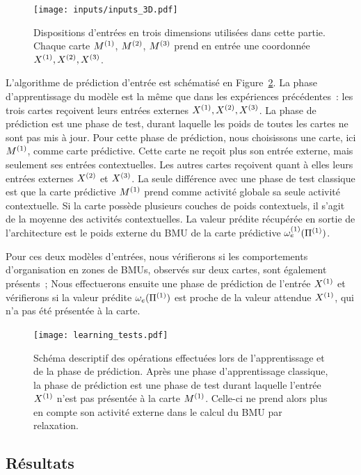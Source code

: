 \documentclass[../main]{subfiles}
\begin{document}
\begin{figure}[h!]
	\texttt{[image: inputs/inputs\_3D.pdf]}
	\caption{Dispositions d'entrées en trois dimensions utilisées dans cette partie. Chaque carte $M^{({1})}$, $M^{({2})}$, $M^{({3})}$ prend en entrée une coordonnée $X^{({1})}, X^{({2})}, X^{({3})}$. \label{fig:inputs_3D}}
\end{figure}

L'algorithme de prédiction d'entrée est schématisé en Figure~\ref{fig:schema_pred}.
La phase d'apprentissage du modèle est la même que dans les expériences précédentes~: les trois cartes reçoivent leurs entrées externes $X^{({1})},X^{({2})}, X^{({3})}$.
La phase de prédiction est une phase de test, durant laquelle les poids de toutes les cartes ne sont pas mis à jour.
Pour cette phase de prédiction, nous choisissons une carte, ici $M^{({1})}$, comme carte prédictive. 
Cette carte ne reçoit plus son entrée externe, mais seulement ses entrées contextuelles. 
Les autres cartes reçoivent quant à elles leurs entrées externes $X^{({2})}$ et $X^{({3})}$.
La seule différence avec une phase de test classique est que la carte prédictive $M^{({1})}$ prend comme activité globale sa seule activité contextuelle. Si la carte possède plusieurs couches de poids contextuels, il s'agit de la moyenne des activités contextuelles.
La valeur prédite récupérée en sortie de l'architecture est le poids externe du BMU de la carte prédictive $\omega_{e}^{({1})}(\Pi^{({1})})$.

Pour ces deux modèles d'entrées, nous vérifierons si les comportements d'organisation en zones de BMUs, observés sur deux cartes, sont également présents~; 
Nous effectuerons ensuite une phase de prédiction de l'entrée $X^{({1})}$ et vérifierons si la valeur prédite $\omega_{e}(\Pi^{({1})})$ est proche de la valeur attendue $X^{({1})}$, qui n'a pas été présentée à la carte.

\begin{figure}
	\texttt{[image: learning\_tests.pdf]}
	\caption{Schéma descriptif des opérations effectuées lors de l'apprentissage et de la phase de prédiction. Après une phase d'apprentissage classique, la phase de prédiction est une phase de test durant laquelle l'entrée $X^{({1})}$ n'est pas présentée à la carte $M^{({1})}$. Celle-ci ne prend alors plus en compte son activité externe dans le calcul du BMU par relaxation. \label{fig:schema_pred}}
\end{figure}

\subsection{Résultats}
\end{document}
